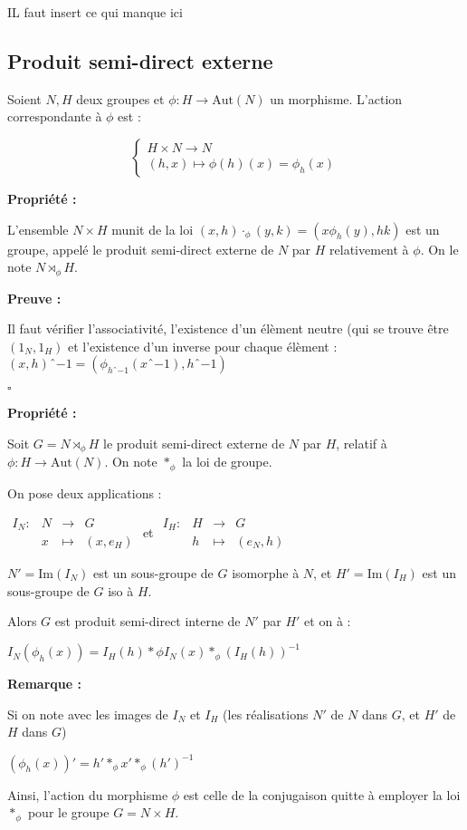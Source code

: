 \documentclass{report}
\renewenvironment{leftbar}{%
  \def\FrameCommand{\vrule width 0.4pt \hspace{10pt}}%
  \MakeFramed {\advance\hsize-\width \FrameRestore}}%
 {\endMakeFramed}%
\newenvironment{preuve}{\vspace*{0.5cm}
    \begin{leftbar}
    \noindent\textbf{Preuve :}\par}{
    \begin{flushright}
    $\square$
    \end{flushright}
    \end{leftbar}
}
\newenvironment{prop}{\begin{tcolorbox}[colframe= white]
    \textbf{Propriété :}
     \par}
    {\end{tcolorbox}}
\newcommand{\remarque}{
    \noindent\textbf{Remarque :} \par
}
\newcommand{\fonction}[5]{
    \begin{array}{l|rcl}
    #1: & #2 & \longrightarrow & #3 \\
        & #4 & \longmapsto & #5 
    \end{array}
}
\newcommand{\dsp}{\displaystyle}
\begin{document}
IL faut insert ce qui manque ici


\subsection{Produit semi-direct externe}
Soient $N, H$ deux groupes et $\phi : H \rightarrow \mathrm{Aut}(N)$ un morphisme.
L'action correspondante à $\phi$ est :

$$ \begin{cases}
H \times N \rightarrow N \\
(h, x) \mapsto \phi(h)(x) = \phi_h(x)
\end{cases}$$


\begin{prop} 
L'ensemble $N \times H$ munit de la loi $(x, h) \cdot_{\phi} (y, k) = (x \phi_h(y), hk)$ est un groupe, appelé le produit semi-direct externe de $N$ par $H$ relativement à $\phi$.
On le note $N \rtimes_{\phi} H$.
\end{prop}


\begin{preuve} 
Il faut vérifier l'associativité, l'existence d'un élèment neutre (qui se trouve être $(1_N, 1_H)$ et l'existence d'un inverse pour chaque élèment : $(x, h)ˆ{-1} = (\phi_{hˆ{-1}} (xˆ{-1}), hˆ{-1})$
\end{preuve}



\begin{prop}
    Soit $G = N\rtimes_{\phi} H$ le produit semi-direct externe de $N$ par $H$, relatif à $\phi :H \rightarrow \textrm{Aut}(N)$. On note $\ast_{\phi}$ la loi de groupe.\par
    
    On pose deux applications : \par 
    \begin{center}
    $\dsp  \fonction{I_N}{N}{G}{x}{(x,e_H)}$ et $\dsp 		\fonction{I_H}{H}{G}{h}{(e_N,h)}$
\end{center}     
\par
   $N' = \text{Im}(I_N)$ est un sous-groupe de $G$ isomorphe à $N$, et $H' = \text{Im}(I_H)$ est un sous-groupe de $G$ iso à $H$.\par

    Alors $G$ est produit semi-direct interne de $N'$ par $H'$ et on à :\par 
$\dsp I_N(\phi_h(x)) = I_H(h) \ast\phi I_N(x) \ast_{\phi} (I_H(h))^{-1}$
\end{prop}

\remarque{
Si on note avec les images de $I_N$ et $I_H$ (les réalisations $N'$ de $N$ dans $G$, et $H'$ de $H$ dans $G$)\par
$(\phi_h(x))' = h' \ast_{\phi} x' \ast_{\phi} (h')^{-1}$\par

Ainsi, l'action du morphisme $\phi$ est celle de la conjugaison quitte à employer la loi $\ast_{\phi}$ pour le groupe $G = N \times H$.}
\end{document}
